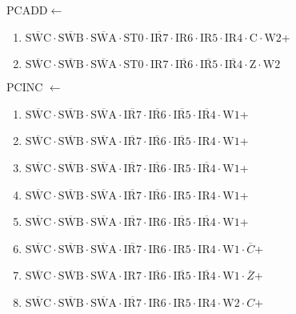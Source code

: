 \documentclass[UTF8]{ctexart}
\begin{document}
PCADD$\leftarrow$
\begin{enumerate}[\indent\indent]
	\item$\overline{\text{SWC}}\cdot\overline{\text{SWB}}\cdot\overline{\text{SWA}}\cdot\text{ST0}\cdot\overline{\text{IR7}}\cdot{\text{IR6}}\cdot{\text{IR5}}\cdot{\text{IR4}}\cdot\text{C}\cdot\text{W2}$+
	\item$\overline{\text{SWC}}\cdot\overline{\text{SWB}}\cdot\overline{\text{SWA}}\cdot\text{ST0}\cdot{\text{IR7}}\cdot\overline{\text{IR6}}\cdot\overline{\text{IR5}}\cdot\overline{\text{IR4}}\cdot\text{Z}\cdot\text{W2}$
\end{enumerate}
PCINC $\leftarrow$
\begin{enumerate}[\indent\indent]
	\item $\overline{\text{SWC}} \cdot\overline{\text{SWB}}\cdot \overline{\text{SWA}} \cdot \overline{\text{IR7}} \cdot \overline{\text{IR6}} \cdot \overline{\text{IR5}} \cdot \overline{\text{IR4}} \cdot \text{W1}$+
	\item $\overline{\text{SWC}} \cdot\overline{\text{SWB}}\cdot \overline{\text{SWA}} \cdot \overline{\text{IR7}} \cdot \overline{\text{IR6}} \cdot \overline{\text{IR5}} \cdot \text{IR4} \cdot \text{W1}$+
	\item $\overline{\text{SWC}} \cdot\overline{\text{SWB}}\cdot \overline{\text{SWA}} \cdot \overline{\text{IR7}} \cdot \overline{\text{IR6}} \cdot \text{IR5} \cdot \overline{\text{IR4}} \cdot \text{W1}$+
	\item $\overline{\text{SWC}} \cdot\overline{\text{SWB}}\cdot \overline{\text{SWA}} \cdot \overline{\text{IR7}} \cdot \overline{\text{IR6}} \cdot \text{IR5} \cdot \text{IR4} \cdot \text{W1}$+
	\item $\overline{\text{SWC}} \cdot\overline{\text{SWB}}\cdot \overline{\text{SWA}} \cdot \overline{\text{IR7}} \cdot \text{IR6} \cdot \overline{\text{IR5}} \cdot \overline{\text{IR4}} \cdot \text{W1}$+
	\item $\overline{\text{SWC}} \cdot\overline{\text{SWB}}\cdot \overline{\text{SWA}} \cdot \overline{\text{IR7}} \cdot \text{IR6} \cdot \text{IR5} \cdot \text{IR4} \cdot \text{W1} \cdot \overline{C}$+
	\item $\overline{\text{SWC}} \cdot\overline{\text{SWB}}\cdot \overline{\text{SWA}} \cdot \text{IR7} \cdot \overline{\text{IR6}} \cdot \overline{\text{IR5}} \cdot \overline{\text{IR4}} \cdot \text{W1} \cdot \overline{Z}$+
	\item $\overline{\text{SWC}} \cdot\overline{\text{SWB}}\cdot \overline{\text{SWA}} \cdot \overline{\text{IR7}} \cdot \text{IR6} \cdot \text{IR5} \cdot \text{IR4} \cdot \text{W2} \cdot C$+

\end{enumerate}
\end{document}
